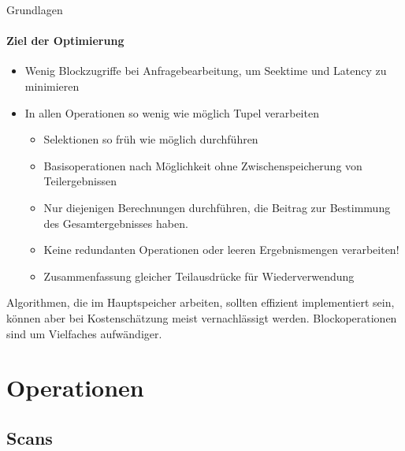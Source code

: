 \begin{frame}{Grundlagen}
\framesubtitle{Ziel der Optimierung}
\begin{itemize}
\item Wenig Blockzugriffe bei Anfragebearbeitung, um Seektime und Latency zu minimieren 
\pause
\item In allen Operationen so wenig wie möglich Tupel verarbeiten 
\begin{itemize}
\item Selektionen so früh wie möglich durchf\"uhren
\item Basisoperationen nach Möglichkeit ohne Zwischenspeicherung von Teilergebnissen
\item Nur diejenigen Berechnungen durchführen, die Beitrag zur Bestimmung des Gesamtergebnisses haben. 
\item Keine redundanten Operationen oder leeren Ergebnismengen verarbeiten! 
\item Zusammenfassung gleicher Teilausdrücke für Wiederverwendung
\end{itemize}
\end{itemize}
\pause
Algorithmen, die im Hauptspeicher arbeiten, sollten effizient implementiert sein, können aber bei Kostensch\"atzung
meist vernachlässigt werden. 
\nl
Blockoperationen sind um Vielfaches aufwändiger.
\end{frame}

\section{Operationen}
\subsection{Scans}

